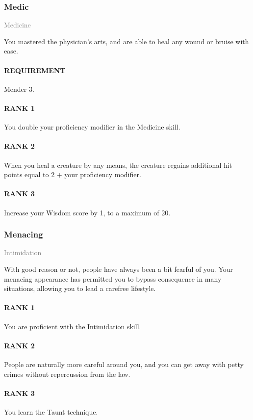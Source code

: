 \subsubsection{Medic} \label{feat::medic}
\small{\textcolor{gray}{Medicine}}

\normalsize
You mastered the physician's arts, and are able to heal any wound or bruise with ease.
\paragraph{REQUIREMENT} Mender 3.
\paragraph{RANK 1} You double your proficiency modifier in the Medicine skill.
\paragraph{RANK 2} When you heal a creature by any means, the creature regains additional hit points equal to 2 + your proficiency modifier.
\paragraph{RANK 3} Increase your Wisdom score by 1, to a maximum of 20.

\subsubsection{Menacing} \label{feat::menacing}
\small{\textcolor{gray}{Intimidation}}

\normalsize
With good reason or not, people have always been a bit fearful of you.
Your menacing appearance has permitted you to bypass consequence in many situations, allowing you to lead a carefree lifestyle.
\paragraph{RANK 1} You are proficient with the Intimidation skill.
\paragraph{RANK 2} People are naturally more careful around you, and you can get away with petty crimes without repercussion from the law.
\paragraph{RANK 3} You learn the Taunt technique.

